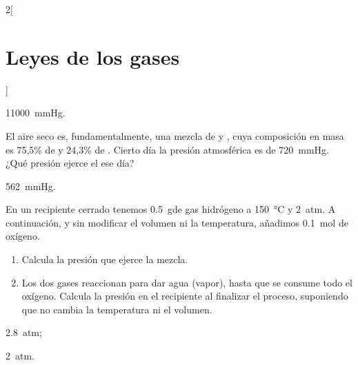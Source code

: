 \documentclass[10pt]{article}
\begin{document}
\begin{multicols}{2}[
  \section{Leyes de los gases}
  ]
  \begin{solution}
    \SI{11000}{\mmHg}.
  \end{solution}




  \begin{exercise}[
      tags    = {termodinámica, entalpía, entalpia de reacción, calor},
      topics  = {química, termoquímica, termodinámica},
      source  = {FQ 1B SAN 2015, p68, ejercicio resuelto 16},
    ]
    El aire seco es, fundamentalmente, una mezcla de  y , cuya composición en masa es 75,5\% de  y 24,3\% de . Cierto día la presión atmosférica es de \SI{720}{\mmHg}. ¿Qué presión ejerce el  ese día?
  \end{exercise}

  \begin{solution}
    \SI{562}{\mmHg}.
  \end{solution}




  \begin{exercise}[
      tags    = {termodinámica, entalpía, entalpia de reacción, calor},
      topics  = {química, termoquímica, termodinámica},
      source  = {FQ 1B SAN 2015, p68, e61},
    ]
    En un recipiente cerrado tenemos \SI{0.5}{\gram}de gas hidrógeno a \SI{150}{\celsius} y \SI{2}{atm}. A continuación,
    y sin modificar el volumen ni la temperatura,
    añadimos \SI{0.1}{\mole} de oxígeno.
    \begin{enumerate}
      \item Calcula la presión que ejerce la mezcla.
      \item Los dos gases reaccionan para dar agua (vapor), hasta
      que se consume todo el oxígeno. Calcula la presión
      en el recipiente al finalizar el proceso, suponiendo que
      no cambia la temperatura ni el volumen.
    \end{enumerate}
  \end{exercise}

  \begin{solution}
    \begin{enumerate*}
      \item \SI{2.8}{atm};
      \item \SI{2}{atm}.
    \end{enumerate*}
  \end{solution}
\end{multicols}
\end{document}
